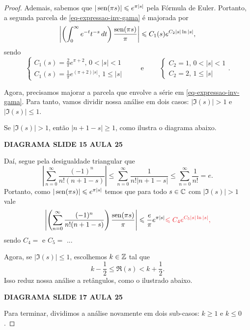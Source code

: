 \begin{proof}
        Ademais, sabemos que $|\operatorname{sen}(\pi s)| \leqslant e^{\pi |s|}$ pela Fórmula de Euler. Portanto,
        a segunda parcela de \eqref{eq-expressao-inv-gama} é majorada por
        \begin{equation}
            \left| \left( \int_0^{\infty} e^{-t}t^{-s} \, dt \right)\frac{\operatorname{sen}(\pi s)}{\pi} \right|
            \leqslant
            C_1(s)e^{C_2|s|\ln|s|},
        \end{equation}
        sendo
        \[
        \begin{cases}
            C_1(s) = \frac{2}{\pi}e^{\pi + 2}, \, 0 < |s| < 1 \\
            C_1(s) = \frac{1}{\pi}e^{(\pi + 2)|s|}, \, 1\leq |s|
        \end{cases} \qquad \text{ e } \qquad
        \begin{cases}
            C_2 = 1, \, 0 < |s| < 1 \\
            C_2 = 2, \, 1\leq |s|
        \end{cases}.
        \]
        
        Agora, precisamos majorar a parcela que envolve a série em \eqref{eq-expressao-inv-gama}.
        Para tanto, vamos dividir nossa análise em dois casos: $|\Im(s)| > 1$ e $|\Im(s)|\leq 1$.
        
        Se $|\Im(s)| > 1$, então $|n+1-s| \geq 1$, como ilustra o diagrama abaixo.
        \begin{center}
            {\bf DIAGRAMA SLIDE 15 AULA 25}
        \end{center}
        Daí, segue pela desigualdade triangular que
        \[
        \left| \sum_{n=0}^{\infty} \frac{(-1)^n}{n!(n+1-s)} \right| 
        \leq \sum_{n=0}^{\infty} \frac{1}{n!|n+1-s|} 
        \leq \sum_{n=0}^{\infty} \frac{1}{n!}
        = e.
        \]
        Portanto, como $|\operatorname{sen}(\pi s)| \leqslant e^{\pi |s|}$ temos que para todo $s\in\mathbb{C}$ com $|\Im(s)|>1$
        vale
        \[
        \left| \left(\sum_{n=0}^{\infty} \frac{(-1)^n}{n!(n+1-s)}\right)\frac{\sen(\pi s)}{\pi} \right|
        \leq \frac{e}{\pi} e^{\pi |s|}
        \red{\leq C_4e^{C_5|s|\ln|s|}},
        \]
        sendo $C_4 = $ e $C_5 = $ ...
        
        Agora, se $|\Im(s)| \leq 1$, escolhemos $k\in\mathbb{Z}$ tal que
        \[
        k - \frac{1}{2} \leq \Re(s) < k + \frac{1}{2}.
        \]
        Isso reduz nossa análise a retângulos, como o ilustrado abaixo.
        \begin{center}
            {\bf DIAGRAMA SLIDE 17 AULA 25}
        \end{center}
        Para terminar, dividimos a análise novamente em dois sub-casos: $k\geq 1$ e $k\leq 0$.
        

\end{proof}
